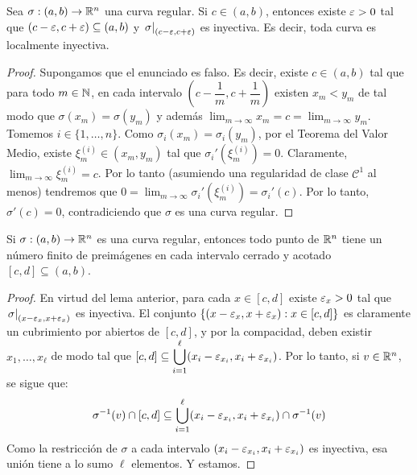 \begin{lem}
Sea $\sigma:(a,b)\to\mathbb{R}^n$ una curva regular. Si $c\in (a,b)$, entonces existe $\varepsilon>0$ tal que $(c-\varepsilon,c+\varepsilon)\subseteq (a,b)$ y $\left.\sigma\right|_{(c-\varepsilon,c+\varepsilon)}$ es inyectiva. Es decir, toda curva es localmente inyectiva.
\begin{proof}
Supongamos que el enunciado es falso. Es decir, existe $c\in (a,b)$ tal que para todo $m\in\mathbb{N}$, en cada intervalo $\left(c-\dfrac{1}{m},c+\dfrac{1}{m}\right)$ existen $x_m<y_m$ de tal modo que $\sigma(x_m)=\sigma(y_m)$ y además $\displaystyle\lim_{m\to\infty}x_m = c = \displaystyle\lim_{m\to \infty}y_m$. Tomemos $i\in\{1,\ldots , n\}$. Como $\sigma_i(x_m)=\sigma_i(y_m)$, por el Teorema del Valor Medio, existe $\xi_m^{(i)}\in (x_m,y_m)$ tal que $\sigma_i'(\xi_m^{(i)})=0$. Claramente, $\lim_{m\to\infty}\xi_m^{(i)}=c$. Por lo tanto (asumiendo una regularidad de clase $\mathscr{C}^1$ al menos) tendremos que $0=\displaystyle\lim_{m\to\infty}\sigma_i'(\xi_m^{(i)})=\sigma_i'(c)$. Por lo tanto, $\sigma'(c)=0$, contradiciendo que $\sigma$ es una curva regular.
\end{proof}
\end{lem}

\begin{cor}
Si $\sigma:(a,b)\to\mathbb{R}^n$ es una curva regular, entonces todo punto de $\mathbb{R}^n$ tiene un número finito de preimágenes en cada intervalo cerrado y acotado $[c,d]\subseteq (a,b)$.
\begin{proof}
En virtud del lema anterior, para cada $x\in [c,d]$ existe $\varepsilon_x>0$ tal que $\left.\sigma\right|_{(x-\varepsilon_x,x+\varepsilon_x)}$ es inyectiva. El conjunto $\{(x-\varepsilon_x,x+\varepsilon_x) : x\in [c,d]\}$ es claramente un cubrimiento por abiertos de $[c,d]$, y por la compacidad, deben existir $x_1,\ldots , x_\ell$ de modo tal que $[c,d]\subseteq\displaystyle\bigcup_{i=1}^{\ell} (x_i-\varepsilon_{x_i},x_i+\varepsilon_{x_i})$. Por lo tanto, si $v\in\mathbb{R}^n$, se sigue que: $$\sigma^{-1}(v)\cap [c,d] \subseteq \displaystyle\bigcup_{i=1}^\ell (x_i-\varepsilon_{x_i},x_i+\varepsilon_{x_i})\cap \sigma^{-1}(v)$$ Como la restricción de $\sigma$ a cada intervalo $(x_i-\varepsilon_{x_i},x_i+\varepsilon_{x_i})$ es inyectiva, esa unión tiene a lo sumo $\ell$ elementos. Y estamos.
\end{proof}
\end{cor}

